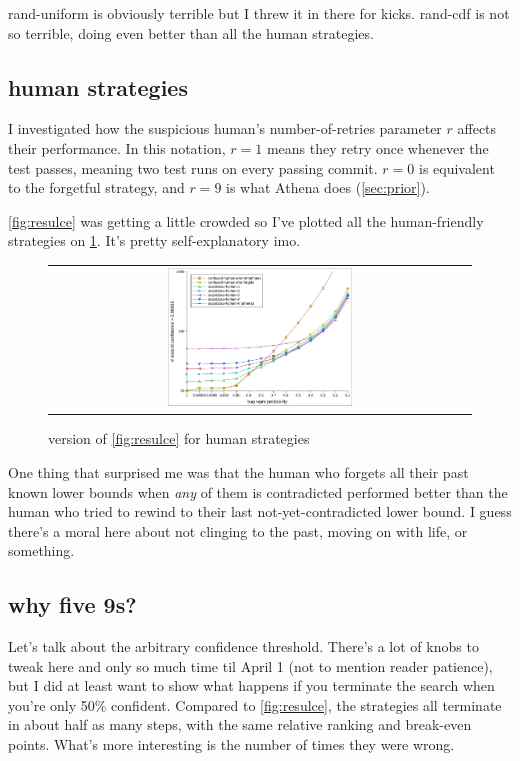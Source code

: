 \documentclass[11pt]{sigplanconf}
\begin{document}
{\sf rand-uniform} is obviously terrible but I threw it in there for kicks.
{\sf rand-cdf} is not so terrible, doing even better than all the human strategies.

\subsection{human strategies}

I investigated how the suspicious human's number-of-retries parameter $r$ affects their performance.
In this notation, $r=1$ means they retry once whenever the test passes, meaning two test runs on every passing commit.
$r=0$ is equivalent to the forgetful strategy, and $r=9$ is what Athena does (\cref{sec:prior}).%

\cref{fig:resulce} was getting a little crowded so I've plotted all the human-friendly strategies on \cref{fig:human}.
It's pretty self-explanatory imo.

\begin{figure}[t]
	\begin{tabular}{c}
		\includegraphics[width=0.45\textwidth]{resulce-human.pdf}
	\end{tabular}
	\caption{version of \cref{fig:resulce} for human strategies}
	\label{fig:human}
\end{figure}

One thing that surprised me was that the human who forgets all their past known lower bounds when {\it any} of them is contradicted
performed better than the human who tried
to rewind to their last not-yet-contradicted lower bound.
I guess there's a moral here about not clinging to the past, moving on with life, or something.

\subsection{why five 9s?}

Let's talk about the arbitrary confidence threshold.
There's a lot of knobs to tweak here and only so much time til April 1 (not to mention reader patience),
but I did at least want to show what happens if you terminate the search when you're only 50\% confident.
Compared to \cref{fig:resulce},
the strategies all terminate in about half as many steps, with the same relative ranking and break-even points.
What's more interesting is the number of times they were wrong.
\end{document}
